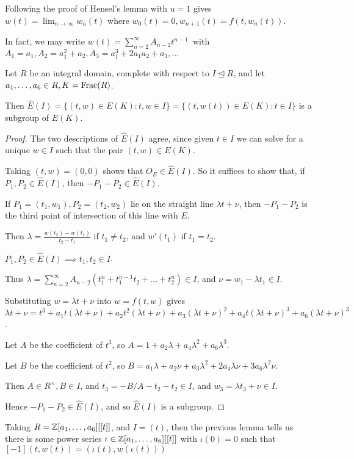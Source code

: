 \documentclass[10pt,a4paper]{article}
\begin{document}
Following the proof of Hensel's lemma with $u = 1$ gives $w(t) = \lim_{n\to \infty} w_n(t)$ where $w_0(t) = 0, w_{n+1}(t)=f(t, w_n(t))$.

In fact, we may write \mbox{$w(t) = \sum_{n=2}^\infty A_{n-2}t^{n-1}$ with $A_1 = a_1, A_2 = a_1^2+a_2, A_3 = a_1^3+2a_1a_2+a_3, \ldots$}

\begin{lemma}
  Let $R$ be an integral domain, complete with respect to $I \trianglelefteq R$, and let $a_1, \ldots, a_6 \in R, K = \operatorname{Frac}(R)$.

  Then $\hat{E}(I) = \{(t,w) \in E(K): t, w \in I\} = \{(t, w(t))\in E(K): t \in I\}$ is a subgroup of $E(K)$.
\end{lemma}
\begin{proof}
  The two descriptions of $\hat{E}(I)$ agree, since given $t \in I$ we can solve for a unique $w \in I$ such that the pair $(t,w)\in E(K)$.

  Taking $(t, w) = (0, 0)$ shows that $O_E \in \hat{E}(I)$. So it suffices to show that, if $P_1, P_2 \in \hat{E}(I)$, then $-P_1-P_2 \in \hat{E}(I)$.

  If $P_1 = (t_1,w_1), P_2 = (t_2,w_2)$ lie on the straight line $\lambda t + \nu$, then $-P_1-P_2$ is the third point of intersection of this line with $E$.

  Then $\lambda = \frac{w(t_2)-w(t_1)}{t_2-t_1}$ if $t_1 \neq t_2$, and $w'(t_1)$ if $t_1=t_2$.

  $P_1, P_2 \in \hat{E}(I) \implies t_1, t_2 \in I$.

  Thus $\lambda = \sum_{n=2}^\infty A_{n-2}(t_1^n + t_1^{n-1}t_2 + \ldots + t_2^n) \in I$, and $\nu = w_1-\lambda t_1 \in I$.

  Substituting $w = \lambda t + \nu$ into $w = f(t,w)$ gives $\lambda t+\nu = t^3 + a_1t(\lambda t+ \nu) + a_2t^2(\lambda t+\nu) + a_3(\lambda t+ \nu)^2 + a_4 t(\lambda t + \nu)^3 + a_6(\lambda t+\nu)^3$.

  Let $A$ be the coefficient of $t^3$, so $A = 1+a_2\lambda+a_4 \lambda^2 + a_6\lambda^3$.

  Let $B$ be the coefficient of $t^2$, so $B = a_1\lambda + a_2\nu + a_3\lambda^2+2a_4\lambda\nu+3a_6\lambda^2\nu$.

  Then $A \in R^\times, B \in I$, and $t_3 = -B/A -t_2 -t_2 \in I$, and $w_3 = \lambda t_3 + \nu \in I$.

  Hence $-P_1-P_2 \in \hat{E}(I)$, and so $\hat{E}(I)$ is a subgroup.
\end{proof}
Taking $R = \mathbb{Z}[a_1, \ldots, a_6][[t]]$, and $I = (t)$, then the previous lemma tells us there is some power series $\iota \in \mathbb{Z}[a_1,\ldots, a_6][[t]]$ with $\iota(0) = 0$ such that $[-1](t, w(t)) = (\iota(t), w(\iota(t)))$
\end{document}
